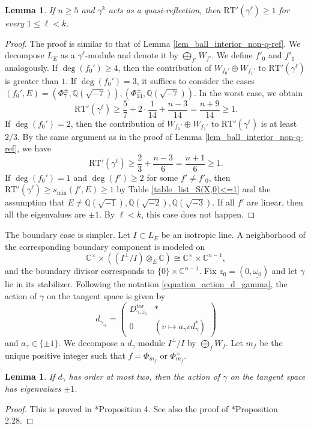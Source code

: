 \documentclass[11pt]{amsart}
\theoremstyle{plain}
\newtheorem{lem}[thm]{Lemma}
\theoremstyle{definition}
\numberwithin{equation}{section}
\newcommand{\bbC}{\mathbb{C}}
\newcommand{\bbQ}{\mathbb{Q}}
\begin{document}
\begin{lem}\label{lem_ball_interior_q-ref}
    If $n\geq5$ and $\gamma^k$ acts as a quasi-reflection, then $\mathrm{RT}'(\gamma^\ell)\geq1$ for every $1\leq\ell<k$.
\end{lem}
\begin{proof}
    The proof is similar to that of Lemma \ref{lem_ball_interior_non-q-ref}.
    We decompose $L_E$ as a $\gamma^\ell$-module and denote it by
    $\bigoplus_{f'} W_{f'}$.
        We define $f'_0$ and $f'_1$ analogously.
    If $\deg(f_0') \geq 4$, then the contribution of $W_{f_0'} \oplus W_{f_1'}$ to $\mathrm{RT}'(\gamma^\ell)$ is greater than $1$.
    If $\deg(f_0') = 3$, it suffices to consider the cases $(f_0',E) = (\Phi_7^\pm, \bbQ(\sqrt{-7})), (\Phi_{14}^\pm, \bbQ(\sqrt{-7}))$.
        In the worst case, we obtain
    \[
    \mathrm{RT}'(\gamma^\ell) \geq \frac{5}{7} + 2 \cdot \frac{1}{14} + \frac{n-3}{14} = \frac{n+9}{14} \geq 1.
    \]
    If $\deg(f_0') = 2$, then the contribution of $W_{f_0'} \oplus W_{f_1'}$ to $\mathrm{RT}'(\gamma^\ell)$ is at least $2/3$.
        By the same argument as in the proof of Lemma \ref{lem_ball_interior_non-q-ref}, we have
    \[
    \mathrm{RT}'(\gamma^\ell) \geq \frac{2}{3} + \frac{n-3}{6} = \frac{n+1}{6} \geq 1.
    \]
    If $\deg(f_0') = 1$ and $\deg(f') \geq 2$ for some $f' \neq f'_0$, then $\mathrm{RT}'(\gamma^{\ell}) \geq s_{\min}(f', E) \geq 1$ by Table \ref{table_list_S(X,0)<=1} and the assumption that $E \neq \bbQ(\sqrt{-1}), \bbQ(\sqrt{-2}), \bbQ(\sqrt{-3})$.
    If all $f'$ are linear, then all the eigenvalues are $\pm 1$.
By $\ell < k$, this case does not happen.
\end{proof}

The boundary case is simpler. Let $I\subset L_E$ be an isotropic line.
A neighborhood of the corresponding boundary component is modeled on
\[
\bbC^\times\times((I^\perp/I)\otimes_E\bbC)
\cong \bbC^\times\times\bbC^{n-1},
\]
and the boundary divisor corresponds to $\{0\}\times\bbC^{n-1}$.
Fix $z_0=(0,\underline{\omega_0})$ and let $\gamma$ lie in its stabilizer.
Following the notation \eqref{equation_action_d_gamma}, the action of $\gamma$ on the tangent space is given by
\[
d_{\gamma_{z_0}} = \begin{pmatrix}
    D_{\gamma,z_0}^{\mathrm{tor}} & * \\
    0 & (v \mapsto a_\gamma v d_\gamma^*)
\end{pmatrix}
\]
and $a_\gamma \in \{\pm 1\}$.
We decompose a $d_\gamma$-module $I^\perp/I$ by $\bigoplus_f W_f$.
Let $m_f$ be the unique positive integer such that $f = \Phi_{m_f}$ or $\Phi_{m_f}^\pm$.
\begin{lem}\label{lem_action_translation}
If $d_\gamma$ has order at most two,
then the action of $\gamma$ on the
tangent space has eigenvalues $\pm1$.
\end{lem}
\begin{proof}
    This is proved in \cite{behrens2012singularities}*{Proposition 4}.
    See also the proof of \cite{Gritsenko2007kodaira}*{Proposition 2.28}.
\end{proof}
\end{document}
